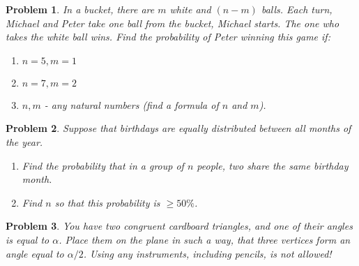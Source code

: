 \documentclass[a4paper,12pt]{article}
\theoremstyle{perfect}
\newtheorem{prb}{Problem}
\begin{document}
\begin{prb}
In a bucket, there are $m$ white and $(n-m)$ balls. Each turn, Michael and Peter take one ball from the bucket, Michael starts. The one who takes the white ball wins. Find the probability of Peter winning this game if:
\begin{enumerate}
\item $n=5, m=1$
\item $n=7, m=2$
\item $n,m$ - any natural numbers (find a formula of $n$ and $m$).
\end{enumerate}
\end{prb}


\begin{prb}
Suppose that birthdays are equally distributed between all months of the year.
\begin{enumerate}
\item Find the probability that in a group of  $n$ people, two share the same birthday month.
\item Find $n$ so that this probability is $\geq 50\%$.
\end{enumerate}
\end{prb} 

\begin{prb}
You have two congruent cardboard triangles, and one of their angles is equal to $\alpha$. 
Place them on the plane in such a way, that three vertices form an angle equal to $\alpha / 2$. Using any instruments, including pencils, is not allowed!
\end{prb}

 
\end{document}
